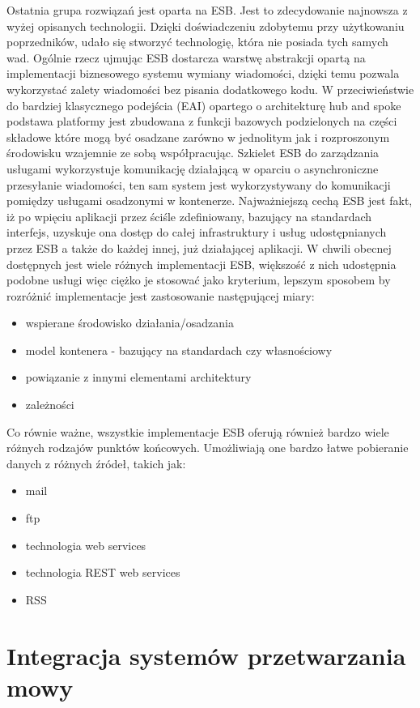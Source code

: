 Ostatnia grupa rozwiązań jest oparta na ESB. Jest to zdecydowanie najnowsza z wyżej opisanych technologii. Dzięki doświadczeniu zdobytemu przy użytkowaniu poprzedników, udało się stworzyć technologię, która nie posiada tych samych wad. Ogólnie rzecz ujmując ESB dostarcza warstwę abstrakcji opartą na implementacji biznesowego systemu wymiany wiadomości, dzięki temu pozwala wykorzystać zalety wiadomości bez pisania dodatkowego kodu. W przeciwieństwie do bardziej klasycznego podejścia (EAI) opartego o architekturę hub and spoke podstawa platformy jest zbudowana z funkcji bazowych podzielonych na części składowe które mogą być osadzane zarówno w jednolitym jak i rozproszonym środowisku wzajemnie ze sobą współpracując. Szkielet ESB do zarządzania usługami wykorzystuje komunikację działającą w oparciu o asynchroniczne przesyłanie wiadomości, ten sam system jest wykorzystywany do komunikacji pomiędzy usługami osadzonymi w kontenerze. Najważniejszą cechą ESB jest fakt, iż po wpięciu aplikacji przez ściśle zdefiniowany, bazujący na standardach interfejs, uzyskuje ona dostęp do całej infrastruktury i usług udostępnianych przez ESB a także do każdej innej, już działającej aplikacji. W chwili obecnej dostępnych jest wiele różnych implementacji ESB, większość z nich udostępnia podobne usługi więc ciężko je stosować jako kryterium, lepszym sposobem by rozróżnić implementacje jest zastosowanie następującej miary:
\begin{itemize}
	\item wspierane środowisko działania/osadzania
	\item model kontenera - bazujący na standardach czy własnościowy
	\item powiązanie z innymi elementami architektury
	\item zależności
\end{itemize}
Co równie ważne, wszystkie implementacje ESB oferują również bardzo wiele różnych rodzajów punktów końcowych. Umożliwiają one bardzo łatwe pobieranie danych z różnych źródeł, takich jak:
\begin{itemize}
	\item mail
	\item ftp
	\item technologia web services
	\item technologia REST web services
	\item RSS
\end{itemize}

\section{Integracja systemów przetwarzania mowy}

